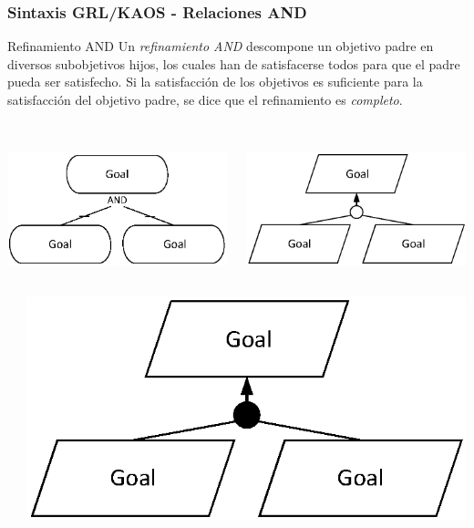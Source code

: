 \documentclass[handout,slidestop,xcolor=pst,dvips,blue]{beamer}
\begin{document}
\begin{frame}[c]
    \frametitle{Sintaxis GRL/KAOS - Relaciones AND}
    \begin{block}{Refinamiento AND}
        Un \alert{\emph{refinamiento AND}} descompone un objetivo padre en diversos subobjetivos hijos, los cuales han de satisfacerse todos para que el padre pueda ser satisfecho. Si la satisfacción de los objetivos es suficiente para la satisfacción del objetivo padre, se dice que el refinamiento es \emph{completo}.
        \ \\
        \ \\
        \begin{columns}[c]
            \begin{column}{.50\linewidth}
                \centering \includegraphics[width=0.65\columnwidth,keepaspectratio=true]{images/objetivos/andRef(GRL).eps}
            \end{column}
            \begin{column}{.50\linewidth}
                \centering \includegraphics[width=0.65\columnwidth,keepaspectratio=true]{images/objetivos/andRef(KAOS).eps}
            \end{column}
        \end{columns}
        \begin{columns}[c]
            \begin{column}{.50\linewidth}
            \end{column}
            \begin{column}{.50\linewidth}
                \centering \includegraphics[width=0.65\columnwidth,keepaspectratio=true]{images/objetivos/andRef(complete)(KAOS).eps}
            \end{column}
        \end{columns}
     \end{block}
\end{frame}
\end{document}
